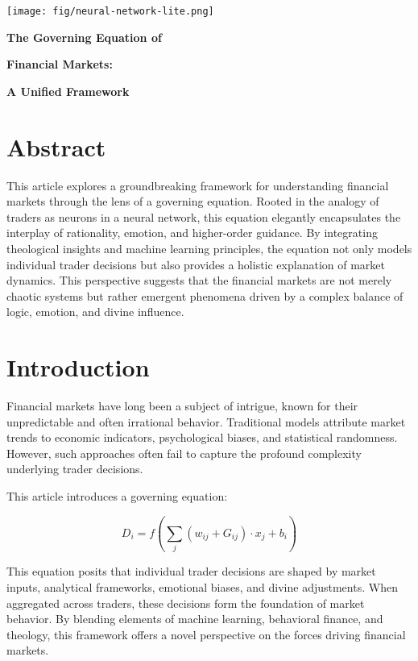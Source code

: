 \documentclass[a4]{article}
\newcommand{\bn}{\bigskip\noindent}
\newcommand{\mn}{\medskip\noindent}
\begin{document}
\begin{center}
\texttt{[image: fig/neural-network-lite.png]}
\end{center}

\mn
{\huge\bf The Governing Equation of  }

\mn
{\huge\bf Financial Markets:  }

\bn
{\huge\bf A Unified Framework }

\bn
\section*{Abstract}

This article explores a groundbreaking framework for understanding financial markets through the lens of a governing equation. Rooted in the analogy of traders as neurons in a neural network, this equation elegantly encapsulates the interplay of rationality, emotion, and higher-order guidance. By integrating theological insights and machine learning principles, the equation not only models individual trader decisions but also provides a holistic explanation of market dynamics. This perspective suggests that the financial markets are not merely chaotic systems but rather emergent phenomena driven by a complex balance of logic, emotion, and divine influence.

\bn
\section{Introduction}

Financial markets have long been a subject of intrigue, known for their unpredictable and often irrational behavior. Traditional models attribute market trends to economic indicators, psychological biases, and statistical randomness. However, such approaches often fail to capture the profound complexity underlying trader decisions. 

\bn
This article introduces a governing equation:

$$
D_i = f\left(\sum_{j} (w_{ij} + G_{ij}) \cdot x_j + b_i\right)
$$

This equation posits that individual trader decisions are shaped by market inputs, analytical frameworks, emotional biases, and divine adjustments. When aggregated across traders, these decisions form the foundation of market behavior. By blending elements of machine learning, behavioral finance, and theology, this framework offers a novel perspective on the forces driving financial markets.
\end{document}
